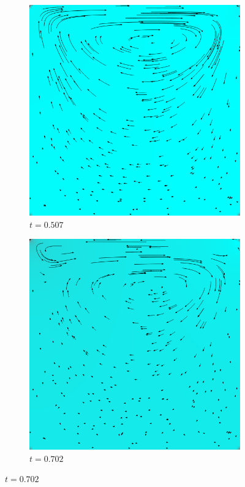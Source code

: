\begin{figure}[!htb]
			\begin{subfigure}[b]{.5\textwidth}
				\includegraphics[scale = 0.28]{screenshots/periodic-00507.png}
				\caption{$t=0.507$}
			\end{subfigure}%
			\begin{subfigure}[b]{.5\textwidth}
				\includegraphics[scale = 0.28]{screenshots/periodic-00702.png}
				\caption{$t=0.702$}
			\end{subfigure}


\end{figure}
